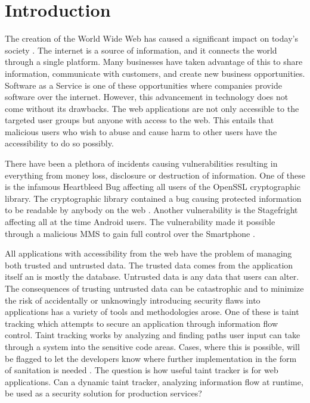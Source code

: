 \chapter{Introduction}
\label{Introduction}
The creation of the World Wide Web has caused a significant impact on today's society \parencite{www}. The internet is a source of information, and it connects the world through a single platform. Many businesses have taken advantage of this to share information, communicate with customers, and create new business opportunities. Software as a Service is one of these opportunities where companies provide software over the internet. \parencite{AllenB.2012SAaS, xaas, NewcombeLee2012SaSa} However, this advancement in technology does not come without its drawbacks. The web applications are not only accessible to the targeted user groups but anyone with access to the web. This entails that malicious users who wish to abuse and cause harm to other users have the accessibility to do so possibly. 

There have been a plethora of incidents causing vulnerabilities resulting in everything from money loss, disclosure or destruction of information. One of these is the infamous Heartbleed Bug affecting all users of the OpenSSL cryptographic library. The cryptographic library contained a bug causing protected information to be readable by anybody on the web \parencite{Heartbleed}. Another vulnerability is the Stagefright affecting all at the time Android users. The vulnerability made it possible through a malicious MMS to gain full control over the Smartphone \parencite{2015ASvt}. 

All applications with accessibility from the web have the problem of managing both trusted and untrusted data. The trusted data comes from the application itself an is mostly the database. Untrusted data is any data that users can alter. The consequences of trusting untrusted data can be catastrophic and to minimize the risk of accidentally or unknowingly introducing security flaws into applications has a variety of tools and methodologies arose. One of these is taint tracking which attempts to secure an application through information flow control. Taint tracking works by analyzing and finding paths user input can take through a system into the sensitive code areas. Cases, where this is possible, will be flagged to let the developers know where further implementation in the form of sanitation is needed \parencite{Pan2015, Venkataramani2008}. The question is how useful taint tracker is for web applications. Can a dynamic taint tracker, analyzing information flow at runtime, be used as a security solution for production services?



